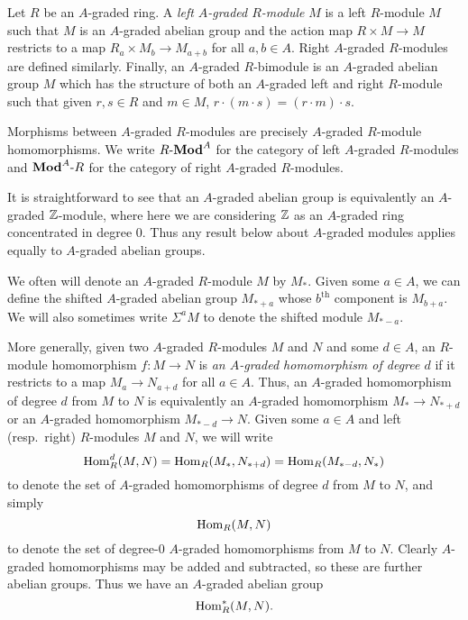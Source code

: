 \documentclass[../main.tex]{subfiles}
\begin{document}
\begin{definition}
	Let $R$ be an $A$-graded ring. A \emph{left $A$-graded $R$-module} $M$ is a left $R$-module $M$ such that $M$ is an $A$-graded abelian group and the action map $R\times M\to M$ restricts to a map $R_a\times M_b\to M_{a+b}$ for all $a,b\in A$. Right $A$-graded $R$-modules are defined similarly. Finally, an $A$-graded $R$-bimodule is an $A$-graded abelian group $M$ which has the structure of both an $A$-graded left and right $R$-module such that given $r,s\in R$ and $m\in M$, $r\cdot(m\cdot s)=(r\cdot m)\cdot s$. 
	
	Morphisms between $A$-graded $R$-modules are precisely $A$-graded $R$-module homomorphisms. We write $R\text-\mathbf{Mod}^A$ for the category of left $A$-graded $R$-modules and $\mathbf{Mod}^A\text-R$ for the category of right $A$-graded $R$-modules.
\end{definition}

\begin{remark}
	It is straightforward to see that an $A$-graded abelian group is equivalently an $A$-graded $\mathbb{Z}$-module, where here we are considering $\mathbb{Z}$ as an $A$-graded ring concentrated in degree $0$. Thus any result below about $A$-graded modules applies equally to $A$-graded abelian groups.
\end{remark}

\begin{remark}
	We often will denote an $A$-graded $R$-module $M$ by $M_*$. Given some $a\in A$, we can define the shifted $A$-graded abelian group $M_{*+a}$ whose $b^\text{th}$ component is $M_{b+a}$. We will also sometimes write $\Sigma^aM$ to denote the shifted module $M_{*-a}$.
\end{remark}

\begin{definition}
    More generally, given two $A$-graded $R$-modules $M$ and $N$ and some $d\in A$, an $R$-module homomorphism $f:M\to N$ is \emph{an $A$-graded homomorphism of degree $d$} if it restricts to a map $M_{a}\to N_{a+d}$ for all $a\in A$. Thus, an $A$-graded homomorphism of degree $d$ from $M$ to $N$ is equivalently an $A$-graded homomorphism $M_{*}\to N_{*+d}$ or an $A$-graded homomorphism $M_{*-d}\to N$. Given some $a\in A$ and left (resp.\ right) $R$-modules $M$ and $N$, we will write 
	\[\mathrm{Hom}_R^d(M,N)=\mathrm{Hom}_R(M_*,N_{*+d})=\mathrm{Hom}_R(M_{*-d},N_*)\]
	to denote the set of $A$-graded homomorphisms of degree $d$ from $M$ to $N$, and simply
	\[\mathrm{Hom}_R(M,N)\] 
	to denote the set of degree-$0$ $A$-graded homomorphisms from $M$ to $N$. Clearly $A$-graded homomorphisms may be added and subtracted, so these are further abelian groups. Thus we have an $A$-graded abelian group
	\[\mathrm{Hom}_R^*(M,N).\]
\end{definition}
\end{document}
